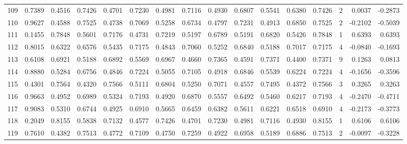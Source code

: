 \begin{tabular}{lrrrrrrrrrrrrrrr}
109 &      0.7389 &  0.4516 &  0.7426 &  0.4701 &  0.7230 &  0.4981 &  0.7116 &  0.4930 &  0.6807 &  0.5541 &   0.6380 &     0.7426 &      2 &                    0.0037 &                    -0.2873 \\
110 &      0.9627 &  0.4588 &  0.7525 &  0.4738 &  0.7069 &  0.5258 &  0.6734 &  0.4797 &  0.7231 &  0.4913 &   0.6850 &     0.7525 &      2 &                   -0.2102 &                    -0.5039 \\
111 &      0.1455 &  0.7848 &  0.5601 &  0.7176 &  0.4731 &  0.7219 &  0.5197 &  0.6789 &  0.5191 &  0.6820 &   0.5426 &     0.7848 &      1 &                    0.6393 &                     0.6393 \\
112 &      0.8015 &  0.6322 &  0.6576 &  0.5435 &  0.7175 &  0.4843 &  0.7060 &  0.5252 &  0.6840 &  0.5188 &   0.7017 &     0.7175 &      4 &                   -0.0840 &                    -0.1693 \\
113 &      0.6108 &  0.6921 &  0.5188 &  0.6892 &  0.5569 &  0.6967 &  0.4660 &  0.7365 &  0.4591 &  0.7371 &   0.4400 &     0.7371 &      9 &                    0.1263 &                     0.0813 \\
114 &      0.8880 &  0.5284 &  0.6756 &  0.4846 &  0.7224 &  0.5055 &  0.7105 &  0.4918 &  0.6846 &  0.5539 &   0.6224 &     0.7224 &      4 &                   -0.1656 &                    -0.3596 \\
115 &      0.4301 &  0.7564 &  0.4320 &  0.7566 &  0.5111 &  0.6804 &  0.5250 &  0.7071 &  0.4557 &  0.7495 &   0.4372 &     0.7566 &      3 &                    0.3265 &                     0.3263 \\
116 &      0.9663 &  0.4952 &  0.6989 &  0.5324 &  0.7193 &  0.4920 &  0.6870 &  0.5557 &  0.6492 &  0.5460 &   0.6217 &     0.7193 &      4 &                   -0.2470 &                    -0.4711 \\
117 &      0.9083 &  0.5310 &  0.6744 &  0.4925 &  0.6910 &  0.5665 &  0.6459 &  0.6382 &  0.5611 &  0.6221 &   0.6518 &     0.6910 &      4 &                   -0.2173 &                    -0.3773 \\
118 &      0.2049 &  0.8155 &  0.5838 &  0.7132 &  0.4577 &  0.7426 &  0.4701 &  0.7230 &  0.4981 &  0.7116 &   0.4930 &     0.8155 &      1 &                    0.6106 &                     0.6106 \\
119 &      0.7610 &  0.4382 &  0.7513 &  0.4772 &  0.7109 &  0.4750 &  0.7259 &  0.4922 &  0.6958 &  0.5189 &   0.6886 &     0.7513 &      2 &                   -0.0097 &                    -0.3228 \\

\end{tabular}
